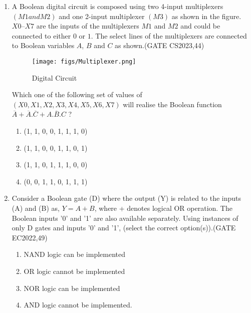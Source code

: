 \begin{enumerate}
\item A Boolean digital circuit is composed using two 4-input multiplexers $(M1 and M2)$ and one 2-input multiplexer $(M3)$ as shown in the figure. $X0$–$X7$ are the inputs of the multiplexers $M1$ and $M2$ and could be connected to either $0$ or $1$. The select lines of the multiplexers are connected to Boolean variables $A$, $B$ and $C$ as shown.\hfill(GATE CS2023,44)

\begin{figure}[H]
    \centering
        \texttt{[image: figs/Multiplexer.png]}
    \caption{Digital Circuit}
    \label{fig:Multiplexer}
\end{figure}

Which one of the following set of values of $(X0, X1, X2, X3, X4, X5, X6, X7)$ will realise the Boolean function 
$\overline{A} + \overline{A}.\overline{C}+A.\overline{B}.C $ ?
 \begin{enumerate}
     \item (1, 1, 0, 0, 1, 1, 1, 0)
     \item (1, 1, 0, 0, 1, 1, 0, 1)
     \item (1, 1, 0, 1, 1, 1, 0, 0)
     \item (0, 0, 1, 1, 0, 1, 1, 1)
 \end{enumerate}

\item
Consider a Boolean gate (D) where the output (Y) is related to the inputs (A) and (B) as, $Y = A + B$, where + denotes logical OR operation. The Boolean inputs '0' and '1' are also available separately. Using instances of only D gates and inputs '0' and '1', (select the correct option(s)).\hfill(GATE EC2022,49)
\begin{enumerate}
\item  NAND logic can be implemented
\item  OR logic cannot be implemented
\item  NOR logic can be implemented
\item  AND logic cannot be implemented.
\end{enumerate}

\end{enumerate}
